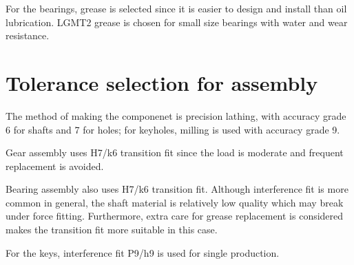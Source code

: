 For the bearings, grease is selected since it is easier to design and install than oil lubrication. LGMT2 grease is chosen for small size bearings with water and wear resistance.

\section{Tolerance selection for assembly}
The method of making the componenet is precision lathing, with accuracy grade 6 for shafts and 7 for holes; for keyholes, milling is used with accuracy grade 9.

Gear assembly uses H7/k6 transition fit since the load is moderate and frequent replacement is avoided.

Bearing assembly also uses H7/k6 transition fit. Although interference fit is more common in general, the shaft material is relatively low quality which may break under force fitting. Furthermore, extra care for grease replacement is considered makes the transition fit more suitable in this case.

For the keys, interference fit P9/h9 is used for single production.